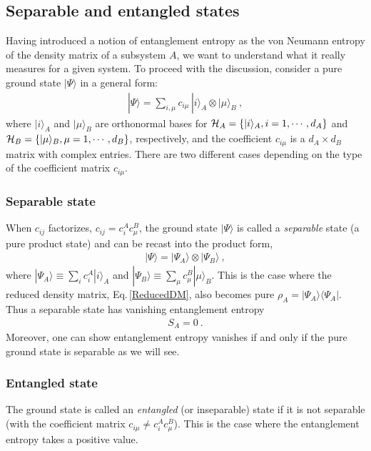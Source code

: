 \subsection{Separable and entangled states}
Having introduced a notion of entanglement entropy as the von Neumann entropy of the density matrix of a subsystem $A$, we want to understand what it really measures for a given system.
To proceed with the discussion, consider a pure ground state $|\Psi\rangle$ in a general form:
\begin{align}\label{PureProductState}
|\Psi\rangle = \sum_{i,\mu} c_{i\mu}\, |i\rangle_A  \otimes |\mu \rangle_B  \ ,
\end{align}
where $|i\rangle_A$ and $|\mu\rangle_B$ are orthonormal bases for ${\cal H}_A = \{ |i\rangle_A, i = 1, \cdots, d_A\}$ and ${\cal H}_B = \{ |\mu\rangle_B, \mu = 1, \cdots, d_B\} $, respectively, and the coefficient $c_{i\mu}$ is a $d_A \times d_B$ matrix with complex entries.
There are two different cases depending on the type of the coefficient matrix $c_{i\mu}$.


\subsubsection{Separable state}
When $c_{ij}$ factorizes, $c_{ij} = c_i^A c_\mu^B$, the ground state $|\Psi\rangle$ is called a \emph{separable} state (a pure product state) and can be recast into the product form,
\begin{align}
|\Psi\rangle = |\Psi_A \rangle \otimes |\Psi_B\rangle \ , 
\end{align}
where $|\Psi_{A} \rangle \equiv \sum_i c_i^{A} |i\rangle_{A}$ and $|\Psi_{B} \rangle \equiv \sum_\mu c_\mu^{B} |\mu\rangle_{B}$.
This is the case where the reduced density matrix, Eq.\,\eqref{ReducedDM}, also becomes pure $\rho_A = |\Psi_A\rangle\langle\Psi_A|$.
Thus a separable state has vanishing entanglement entropy
\begin{align}
	S_A = 0 \ .
\end{align}
Moreover, one can show entanglement entropy vanishes if and only if the pure ground state is separable as we will see.


\subsubsection{Entangled state} 
The ground state is called an {\it entangled} (or inseparable) state if it is not separable (with the coefficient matrix $c_{i\mu} \neq c_i^A c_\mu^B$).
This is the case where the entanglement entropy takes a positive value.

